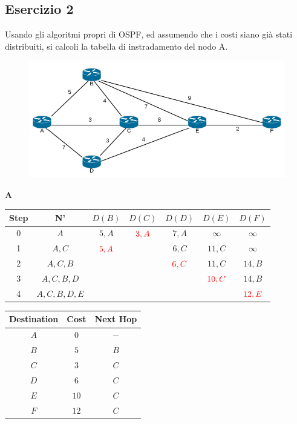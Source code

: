 \documentclass[10pt]{article}
\begin{document}
	\subsection{Esercizio 2}
	Usando gli algoritmi propri di OSPF, ed assumendo che i costi siano già stati distribuiti, si calcoli la tabella di instradamento del nodo A.
	\begin{figure}[h]
	\centering
	\includegraphics[width=13cm]{es2}
	\end{figure}
	\begin{center}
	\textbf{A}
 		\begin{tabular}{||c c c c c c c||} 
 			\hline
 			Step & N' & $D(B)$ & $D(C)$ & $D(D)$ & $D(E)$ & $D(F)$ \\[0.5ex] 
 			\hline\hline
 			0 & $A$ & $5,A$ & $\color{red} 3,A$ & $7,A$ & $\infty$ & $\infty$ \\ 
 			\hline
 			1 & $A,C$ & $\color{red} 5,A$ & & $6,C$ & $11,C$ & $\infty$ \\ 
 			\hline
 			2 & $A,C,B$ & & & $\color{red} 6,C$ & $11,C$ & $14,B$ \\
 			\hline
 			3 & $A,C,B,D$ & & & & $\color{red} 10,C$ & $14,B$ \\
 			\hline
 			4 & $A,C,B,D,E$ & & & & & $\color{red} 12,E$ \\[0.5ex] 
 			\hline
		\end{tabular}
		\quad
		\begin{tabular}{||c || c || c||}
			\hline
 			Destination & Cost & Next Hop\\[0.5ex] 
 			\hline\hline
			$A$ & $0$ & $-$\\
			$B$ & $5$ & $B$\\
 			$C$ & $3$ & $C$\\
			$D$ & $6$ & $C$\\
			$E$ & $10$ & $C$\\
			$F$ & $12$ & $C$\\[0.5ex] 
			\hline
		\end{tabular}
	\end{center}
	
\end{document}
